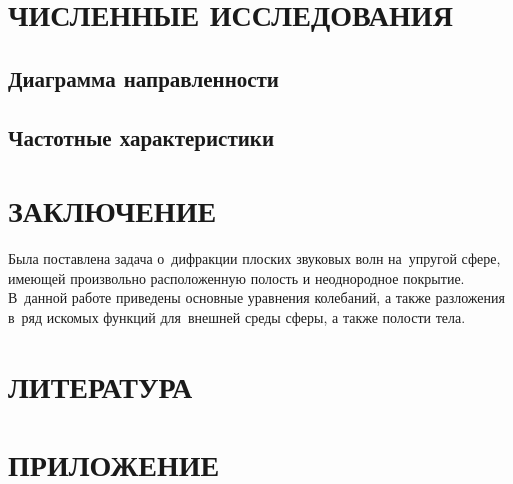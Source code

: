 \newpage
\section{ЧИСЛЕННЫЕ ИССЛЕДОВАНИЯ}

\newpage
\subsection{Диаграмма направленности}

\newpage
\subsection{Частотные характеристики}


\newpage
\section*{ЗАКЛЮЧЕНИЕ}
Была поставлена задача о~дифракции плоских звуковых волн на~упругой сфере, имеющей произвольно расположенную полость и неоднородное покрытие. В~данной работе приведены основные уравнения колебаний, а также разложения в~ряд искомых функций для~внешней среды сферы, а также полости тела.

\newpage
\section*{ЛИТЕРАТУРА}

\newpage
\section*{ПРИЛОЖЕНИЕ}
